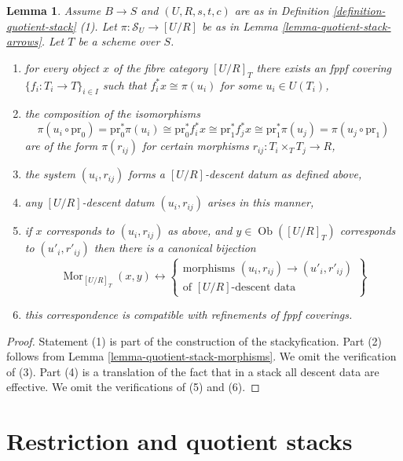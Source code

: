 \documentclass{stacks-project}
\theoremstyle{plain}
\newtheorem{lemma}[subsection]{Lemma}
\theoremstyle{definition}
\theoremstyle{remark}
\numberwithin{equation}{subsection}
\def\Mor{\mathop{\mathrm{Mor}}\nolimits}
\def\Ob{\mathop{\mathrm{Ob}}\nolimits}
\begin{document}
\begin{lemma}
\label{lemma-quotient-stack-objects}
Assume $B \to S$ and $(U, R, s, t, c)$ are as in
Definition \ref{definition-quotient-stack} (1).
Let $\pi : \mathcal{S}_U \to [U/R]$ be as in
Lemma \ref{lemma-quotient-stack-arrows}.
Let $T$ be a scheme over $S$.
\begin{enumerate}
\item for every object $x$ of the fibre category $[U/R]_T$
there exists an fppf covering $\{f_i : T_i \to T\}_{i \in I}$ such that
$f_i^*x \cong \pi(u_i)$ for some $u_i \in U(T_i)$,
\item the composition of the isomorphisms
$$
\pi(u_i \circ \text{pr}_0)
=
\text{pr}_0^*\pi(u_i)
\cong
\text{pr}_0^*f_i^*x
\cong
\text{pr}_1^*f_j^*x
\cong
\text{pr}_1^*\pi(u_j)
=
\pi(u_j \circ \text{pr}_1)
$$
are of the form $\pi(r_{ij})$ for certain morphisms
$r_{ij} : T_i \times_T T_j \to R$,
\item the system $(u_i, r_{ij})$ forms
a $[U/R]$-descent datum as defined above,
\item any $[U/R]$-descent datum $(u_i, r_{ij})$ arises in this manner,
\item if $x$ corresponds to $(u_i, r_{ij})$ as above, and
$y \in \Ob([U/R]_T)$ corresponds to $(u'_i, r'_{ij})$
then there is a canonical bijection
$$
\Mor_{[U/R]_T}(x, y)
\longleftrightarrow
\left\{
\begin{matrix}
\text{morphisms }(u_i, r_{ij}) \to (u'_i, r'_{ij})\\
\text{of }[U/R]\text{-descent data}
\end{matrix}
\right\}
$$
\item this correspondence is compatible with refinements of fppf coverings.
\end{enumerate}
\end{lemma}

\begin{proof}
Statement (1) is part of the construction of the stackyfication.
Part (2) follows from
Lemma \ref{lemma-quotient-stack-morphisms}.
We omit the verification of (3).
Part (4) is a translation of the fact that in a stack all descent data
are effective.
We omit the verifications of (5) and (6).
\end{proof}








\section{Restriction and quotient stacks}
\label{section-quotient-stack-restrict}
\end{document}

